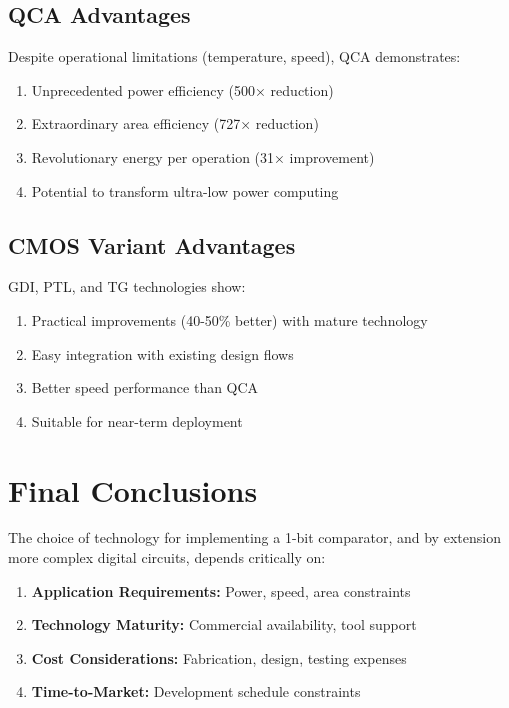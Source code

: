 \documentclass[12pt,a4paper,twoside]{report}
\begin{document}
\subsection{QCA Advantages}

Despite operational limitations (temperature, speed), QCA demonstrates:
\begin{enumerate}
    \item Unprecedented power efficiency (500× reduction)
    \item Extraordinary area efficiency (727× reduction)
    \item Revolutionary energy per operation (31× improvement)
    \item Potential to transform ultra-low power computing
\end{enumerate}

\subsection{CMOS Variant Advantages}

GDI, PTL, and TG technologies show:
\begin{enumerate}
    \item Practical improvements (40-50\% better) with mature technology
    \item Easy integration with existing design flows
    \item Better speed performance than QCA
    \item Suitable for near-term deployment
\end{enumerate}

\section{Final Conclusions}

The choice of technology for implementing a 1-bit comparator, and by extension more complex digital circuits, depends critically on:

\begin{enumerate}
    \item \textbf{Application Requirements:} Power, speed, area constraints
    \item \textbf{Technology Maturity:} Commercial availability, tool support
    \item \textbf{Cost Considerations:} Fabrication, design, testing expenses
    \item \textbf{Time-to-Market:} Development schedule constraints
\end{enumerate}
\end{document}

